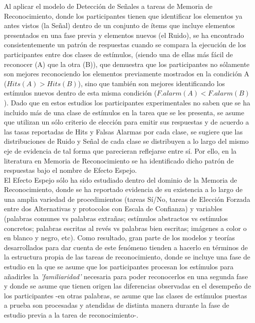 Al aplicar el modelo de Detección de Señales a tareas de Memoria de Reconocimiento, donde los participantes tienen que identificar los elementos ya antes vistos (la Señal) dentro de un conjunto de ítems que incluye elementos presentados en una fase previa y elementos nuevos (el Ruido), se ha encontrado consistentemente un patrón de respuestas cuando se compara la ejecución de los participantes entre dos clases de estímulos, (siendo una de ellas más fácil de reconocer (A) que la otra (B)), que demuestra que los participantes no sólamente son mejores reconociendo los elementos previamente mostrados en la condición A ($Hits(A)>Hits(B)$), sino que también son mejores identificando los estímulos nuevos dentro de esta misma condición ($F.alarm(A)<F.alarm(B)$). Dado que en estos estudios los participantes experimentales no saben que se ha incluido más de una clase de estímulos en la tarea que se les presenta, se asume que utilizan un sólo criterio de elección para emitir sus respuestas y de acuerdo a las tasas reportadas de Hits y Falsas Alarmas por cada clase, se sugiere que las distribuciones de Ruido y Señal de cada clase se distribuyen a lo largo del mismo eje de evidencia de tal forma que parecieran reflejarse entre sí. Por ello, en la literatura en Memoria de Reconocimiento se ha identificado dicho patrón de respuestas bajo el nombre de Efecto Espejo.\\

El Efecto Espejo sólo ha sido estudiado dentro del dominio de la Memoria de Reconocimiento, donde se ha reportado evidencia de su existencia a lo largo de una amplia variedad de procedimientos (tareas Sí/No, tareas de Elección Forzada entre dos Alternativas y protocolos con Escala de Confianza) y variables (palabras comunes vs palabras extrañas; estímulos abstractos vs estímulos concretos; palabras escritas al revés vs palabras bien escritas; imágenes a color o en blanco y negro, etc). Como resultado, gran parte de los modelos y teorías desarrollados para dar cuenta de este fenómeno tienden a hacerlo en términos de la estructura propia de las tareas de reconocimiento, donde se incluye una fase de estudio en la que se asume que los participantes procesan los estímulos para añadirles la \textit{'familiaridad'} necesaria para poder reconocerlos en una segunda fase y donde se asume que tienen origen las diferencias observadas en el desempeño de los participantes -en otras palabras, se asume que las clases de estímulos puestas a prueba son procesadas y atendidas de distinta manera durante la fase de estudio previa a la tarea de reconocimiento-.\\

